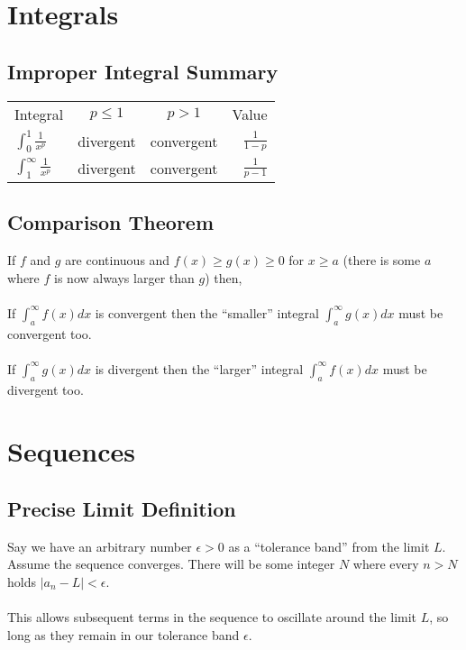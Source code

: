 \documentclass[12pt]{article}
\begin{document}
\section{Integrals}


\subsection{Improper Integral Summary}

\def\arraystretch{3}
\begin{tabular}{lccr}
    Integral & $p \leq 1$ & $p > 1$ & Value\\
    $\displaystyle\int_{0}^{1} \frac{1}{x^p}$ & divergent & convergent & $\displaystyle\frac{1}{1-p}$\\
    $\displaystyle\int_{1}^{\infty} \frac{1}{x^p}$ & divergent & convergent & $\displaystyle\frac{1}{p-1}$\\
\end{tabular}


\subsection{Comparison Theorem}

If $f$ and $g$ are continuous and
$f(x) \geq g(x) \geq 0$ for $x \geq a$
(there is some $a$ where $f$ is now always larger than $g$)
then,\\
\\
If $\int_{a}^{\infty} f(x)dx$ is convergent then the ``smaller'' integral
$\int_{a}^{\infty} g(x)dx$ must be convergent too.\\
\\
If $\int_{a}^{\infty} g(x)dx$ is divergent then the ``larger'' integral
$\int_{a}^{\infty} f(x)dx$ must be divergent too.\\


\section{Sequences}


\subsection{Precise Limit Definition}

Say we have an arbitrary number $\epsilon > 0$ as a ``tolerance band'' from the limit $L$.
Assume the sequence converges.
There will be some integer $N$ where every $n > N$ holds $\left|a_n - L\right| < \epsilon$.
\\
\\
This allows subsequent terms in the sequence to oscillate around the limit $L$, so long as they remain in our tolerance band $\epsilon$.
\end{document}
